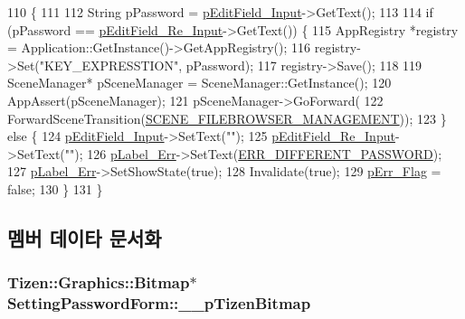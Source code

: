 \begin{DoxyCode}
110                                               \{
111 
112     String pPassword = \hyperlink{class_setting_password_form_a2cd9d5f0b6101f19f47dbf6c6d268d71}{pEditField\_Input}->GetText();
113 
114     \textcolor{keywordflow}{if} (pPassword == \hyperlink{class_setting_password_form_a45848a36b44d294a9e7ddd1d921c990d}{pEditField\_Re\_Input}->GetText()) \{
115         AppRegistry *registry = Application::GetInstance()->GetAppRegistry();
116         registry->Set(\textcolor{stringliteral}{"KEY\_EXPRESSTION"}, pPassword);
117         registry->Save();
118 
119         SceneManager* pSceneManager = SceneManager::GetInstance();
120         AppAssert(pSceneManager);
121         pSceneManager->GoForward(
122                 ForwardSceneTransition(\hyperlink{_scene_register_8h_ad2cc89ed96c8bd4c94f954f01ef0f56e}{SCENE\_FILEBROWSER\_MANAGEMENT}));
123     \} \textcolor{keywordflow}{else} \{
124         \hyperlink{class_setting_password_form_a2cd9d5f0b6101f19f47dbf6c6d268d71}{pEditField\_Input}->SetText(\textcolor{stringliteral}{""});
125         \hyperlink{class_setting_password_form_a45848a36b44d294a9e7ddd1d921c990d}{pEditField\_Re\_Input}->SetText(\textcolor{stringliteral}{""});
126         \hyperlink{class_setting_password_form_a2cddadd3fdd619dc859566a6fde37c23}{pLabel\_Err}->SetText(\hyperlink{_setting_password_form_8cpp_afee2127ede8ad3648435466ebccf3b83}{ERR\_DIFFERENT\_PASSWORD});
127         \hyperlink{class_setting_password_form_a2cddadd3fdd619dc859566a6fde37c23}{pLabel\_Err}->SetShowState(\textcolor{keyword}{true});
128         Invalidate(\textcolor{keyword}{true});
129         \hyperlink{_setting_password_form_8cpp_a84390b7bf6efb197dcb38cad6a7fa20a}{pErr\_Flag} = \textcolor{keyword}{false};
130     \}
131 \}
\end{DoxyCode}


\subsection{멤버 데이타 문서화}
\hypertarget{class_setting_password_form_a60cc925eb42ef6db4a87fb7ed831443e}{
\subsubsection[{\+\_\+\+\_\+p\+Tizen\+Bitmap}]{\setlength{\rightskip}{0pt plus 5cm}Tizen\+::\+Graphics\+::\+Bitmap$\ast$ Setting\+Password\+Form\+::\+\_\+\+\_\+p\+Tizen\+Bitmap\hspace{0.3cm}{\ttfamily [private]}}}\label{class_setting_password_form_a60cc925eb42ef6db4a87fb7ed831443e}


